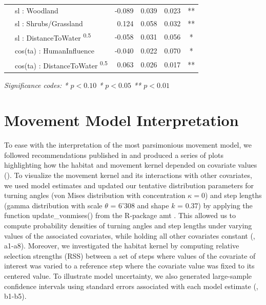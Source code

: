 \documentclass[abstract=off,10pt,a4paper,bibliography=totocnumbered]{article}
\begin{document}
\begin{table}
\begin{center}
{\begin{threeparttable}
\begin{tabular}{llrrrc}
         & sl : Woodland & -0.089 & 0.039 & 0.023 & ** \\
         & sl : Shrubs/Grassland & 0.124 & 0.058 & 0.032 & ** \\
         & sl : DistanceToWater \textsuperscript{0.5} & -0.058 & 0.031 & 0.056 & * \\
         & cos(ta) : HumanInfluence & -0.040 & 0.022 & 0.070 & * \\
         & cos(ta) : DistanceToWater \textsuperscript{0.5} & 0.063 & 0.026 & 0.017 & ** \\
         \bottomrule
      \end{tabular}
       \begin{tablenotes}
         \item \textit{Significance codes: * \(p < 0.10\) \quad ** \(p < 0.05\)
         \quad *** \(p < 0.01\)}
       \end{tablenotes}
    \end{threeparttable}
    }
  \end{center}
\end{table}

\newpage
\section{Movement Model Interpretation}
To ease with the interpretation of the most parsimonious movement model, we
followed recommendations published in \cite{Fieberg.2020} and produced a series
of plots highlighting how the habitat and movement kernel depended on covariate
values (). To visualize the movement kernel and its
interactions with other covariates, we used model estimates and updated our
tentative distribution parameters for turning angles (von Mises distribution
with concentration \(\kappa = 0\)) and step lengths (gamma distribution with
scale \(\theta\) = 6'308 and shape \(k\) = 0.37) by applying the function
\textsf{update\_vonmises()} from the R-package \textsf{amt} \citep{Amt.2019}.
This allowed us to compute probability densities of turning angles and step
lengths under varying values of the associated covariates, while holding all
other covariates constant (, a1-a8). Moreover, we
investigated the habitat kernel by computing relative selection strengths (RSS)
between a set of steps where values of the covariate of interest was varied to a
reference step where the covariate value was fixed to its centered value. To
illustrate model uncertainty, we also generated large-sample confidence
intervals using standard errors associated with each model estimate
(, b1-b5).
\end{document}
